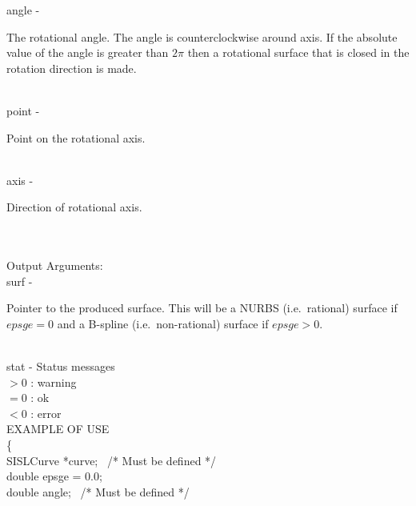         \>\>    {\fov angle}    \> - \> \begin{minipg2}
                        The rotational angle. The angle is counterclockwise around axis. If the absolute
                        value of the angle is greater than $2\pi$ then a rotational surface that is
                        closed in the rotation direction is made.
                                \end{minipg2}\\[0.8ex]
        \>\>    {\fov point}    \> - \> \begin{minipg2}
                                Point on the rotational axis.
                                \end{minipg2} \\
        \>\>    {\fov axis}     \> - \> \begin{minipg2}
                                Direction of rotational axis.
                                \end{minipg2} \\
\\
        \>Output Arguments:\\
        \>\>    {\fov surf}     \> - \> \begin{minipg2}
                                        Pointer to the produced surface.
                                        This will be a NURBS (i.e.\
                                        rational) surface if $epsge=0$
                                        and a \mbox{B-spline} (i.e.\
                                        non-rational) surface if $epsge>0$.
                                \end{minipg2}\\
        \>\>    {\fov stat}     \> - \> Status messages\\
                \>\>\>\>\>              $>0$    : warning\\
                \>\>\>\>\>              $=0$    : ok\\
                \>\>\>\>\>              $<0$    : error\\
\newpagetabs
EXAMPLE OF USE\\
                \>      \{ \\
                \>\>    SISLCurve       \>      *{\fov curve}; \, /* Must be defined */\\
                \>\>    double  \>      {\fov epsge} = 0.0;\\
                \>\>    double  \>      {\fov angle}; \, /* Must be defined */\\
